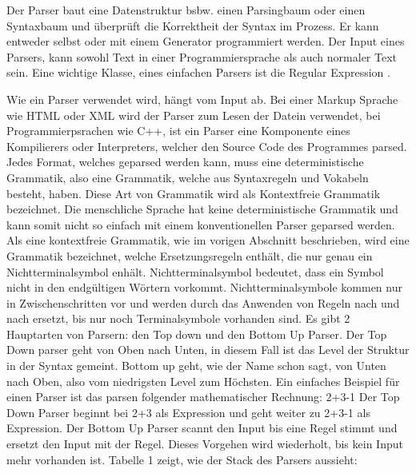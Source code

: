 Der Parser baut eine Datenstruktur bsbw. einen Parsingbaum oder einen Syntaxbaum und überprüft die Korrektheit der Syntax im Prozess. Er kann entweder selbst oder mit einem Generator programmiert werden. Der Input eines Parsers, kann sowohl Text in einer Programmiersprache als auch normaler Text sein. Eine wichtige Klasse, eines einfachen Parsers ist die \glqq{} Regular Expression \grqq{}.

Wie ein Parser verwendet wird, hängt vom Input ab. Bei einer Markup Sprache wie HTML oder XML wird der Parser zum Lesen der Datein verwendet, bei Programmierpsrachen wie C++, ist ein Parser eine Komponente eines Kompilierers oder Interpreters, welcher den Source Code des Programmes parsed.\newline\newline
Jedes Format, welches geparsed werden kann, muss eine deterministische Grammatik, also eine Grammatik, welche aus Syntaxregeln und Vokabeln besteht, haben. Diese Art von Grammatik wird als \glqq{} Kontextfreie Grammatik \grqq{} bezeichnet. Die menschliche Sprache hat keine deterministische Grammatik und kann somit nicht so einfach mit einem konventionellen Parser geparsed werden. \autocite[]{Garsiel.}\newline\newline
Als eine kontextfreie Grammatik, wie im vorigen Abschnitt beschrieben, wird eine Grammatik bezeichnet, welche Ersetzungsregeln enthält, die nur genau ein Nichtterminalsymbol enhält. Nichtterminalsymbol bedeutet, dass ein Symbol nicht in den endgültigen Wörtern vorkommt. Nichtterminalsymbole kommen nur in Zwischenschritten vor und werden durch das Anwenden von Regeln nach und nach ersetzt, bis nur noch Terminalsymbole vorhanden sind.\newline\newline
Es gibt 2 Hauptarten von Parsern: den \glqq{}Top down \grqq{} und den \glqq{} Bottom Up \grqq{} Parser. Der Top Down parser geht von Oben nach Unten, in diesem Fall ist das Level der Struktur in der Syntax gemeint. Bottom up geht, wie der Name schon sagt, von Unten nach Oben, also vom niedrigsten Level zum Höchsten. \newline
Ein einfaches Beispiel für einen Parser ist das parsen folgender mathematischer Rechnung:
2+3-1\newline
Der Top Down Parser beginnt bei 2+3 als Expression und geht weiter zu 2+3-1 als Expression. \newline
Der Bottom Up Parser scannt den Input bis eine Regel stimmt und ersetzt den Input mit der Regel. Dieses Vorgehen wird wiederholt, bis kein Input mehr vorhanden ist. Tabelle 1 zeigt, wie der Stack des Parsers aussieht:
